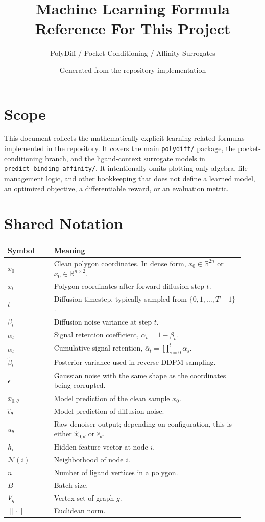 \documentclass[11pt]{article}
\title{Machine Learning Formula Reference For This Project}
\author{PolyDiff / Pocket Conditioning / Affinity Surrogates}
\date{Generated from the repository implementation}
\newcommand{\R}{\mathbb{R}}
\begin{document}
\maketitle
\tableofcontents

\section{Scope}
This document collects the mathematically explicit learning-related formulas implemented in the repository. It covers the main \texttt{polydiff/} package, the pocket-conditioning branch, and the ligand-context surrogate models in \texttt{predict\_binding\_affinity/}. It intentionally omits plotting-only algebra, file-management logic, and other bookkeeping that does not define a learned model, an optimized objective, a differentiable reward, or an evaluation metric.

\section{Shared Notation}
\begin{tabular}{>{\raggedright\arraybackslash}p{0.18\linewidth} >{\raggedright\arraybackslash}p{0.74\linewidth}}
\toprule
Symbol & Meaning \\
\midrule
$x_0$ & Clean polygon coordinates. In dense form, $x_0 \in \R^{2n}$ or $x_0 \in \R^{n \times 2}$. \\
$x_t$ & Polygon coordinates after forward diffusion step $t$. \\
$t$ & Diffusion timestep, typically sampled from $\{0,1,\dots,T-1\}$. \\
$\beta_t$ & Diffusion noise variance at step $t$. \\
$\alpha_t$ & Signal retention coefficient, $\alpha_t = 1 - \beta_t$. \\
$\bar{\alpha}_t$ & Cumulative signal retention, $\bar{\alpha}_t = \prod_{s=0}^t \alpha_s$. \\
$\tilde{\beta}_t$ & Posterior variance used in reverse DDPM sampling. \\
$\epsilon$ & Gaussian noise with the same shape as the coordinates being corrupted. \\
$\hat{x}_{0,\theta}$ & Model prediction of the clean sample $x_0$. \\
$\hat{\epsilon}_\theta$ & Model prediction of diffusion noise. \\
$\hat{u}_\theta$ & Raw denoiser output; depending on configuration, this is either $\hat{x}_{0,\theta}$ or $\hat{\epsilon}_\theta$. \\
$h_i$ & Hidden feature vector at node $i$. \\
$\mathcal{N}(i)$ & Neighborhood of node $i$. \\
$n$ & Number of ligand vertices in a polygon. \\
$B$ & Batch size. \\
$V_g$ & Vertex set of graph $g$. \\
$\|\cdot\|$ & Euclidean norm. \\
\bottomrule
\end{tabular}
\end{document}
